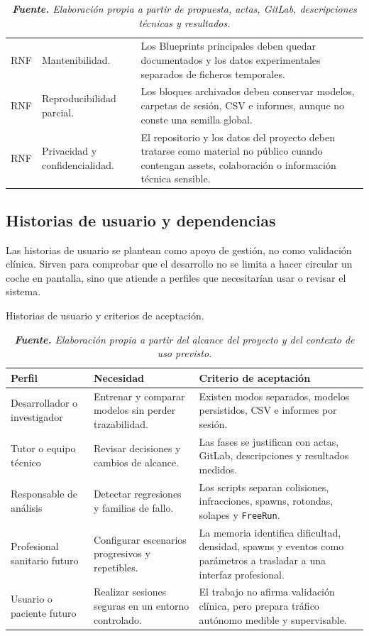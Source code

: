 \begin{table}[htbp]
\begin{tabularx}{0.96\textwidth}{L{1.7cm}L{4.2cm}>{\raggedright\arraybackslash}X}
RNF & Mantenibilidad. & Los Blueprints principales deben quedar documentados y los datos experimentales separados de ficheros temporales.\\
RNF & Reproducibilidad parcial. & Los bloques archivados deben conservar modelos, carpetas de sesión, CSV e informes, aunque no conste una semilla global.\\
RNF & Privacidad y confidencialidad. & El repositorio y los datos del proyecto deben tratarse como material no público cuando contengan assets, colaboración o información técnica sensible.\\
\bottomrule
\end{tabularx}
\caption*{\textit{\textbf{Fuente.} Elaboración propia a partir de propuesta, actas, GitLab, descripciones técnicas y resultados.}}
\end{table}

\subsection{Historias de usuario y dependencias}

Las historias de usuario se plantean como apoyo de gestión, no como validación clínica. Sirven para comprobar que el desarrollo no se limita a hacer circular un coche en pantalla, sino que atiende a perfiles que necesitarían usar o revisar el sistema.

\begin{table}[htbp]
\centering
\caption{Historias de usuario y criterios de aceptación.}%
\label{tab:historias-usuario}
\begin{tabularx}{0.96\textwidth}{L{3.2cm}>{\raggedright\arraybackslash}X>{\raggedright\arraybackslash}X}
\toprule
\textbf{Perfil} & \textbf{Necesidad} & \textbf{Criterio de aceptación}\\
\midrule
Desarrollador o investigador & Entrenar y comparar modelos sin perder trazabilidad. & Existen modos separados, modelos persistidos, CSV e informes por sesión.\\
Tutor o equipo técnico & Revisar decisiones y cambios de alcance. & Las fases se justifican con actas, GitLab, descripciones y resultados medidos.\\
Responsable de análisis & Detectar regresiones y familias de fallo. & Los scripts separan colisiones, infracciones, spawns, rotondas, solapes y \texttt{FreeRun}.\\
Profesional sanitario futuro & Configurar escenarios progresivos y repetibles. & La memoria identifica dificultad, densidad, spawns y eventos como parámetros a trasladar a una interfaz profesional.\\
Usuario o paciente futuro & Realizar sesiones seguras en un entorno controlado. & El trabajo no afirma validación clínica, pero prepara tráfico autónomo medible y supervisable.\\
\bottomrule
\end{tabularx}
\caption*{\textit{\textbf{Fuente.} Elaboración propia a partir del alcance del proyecto y del contexto de uso previsto.}}
\end{table}

